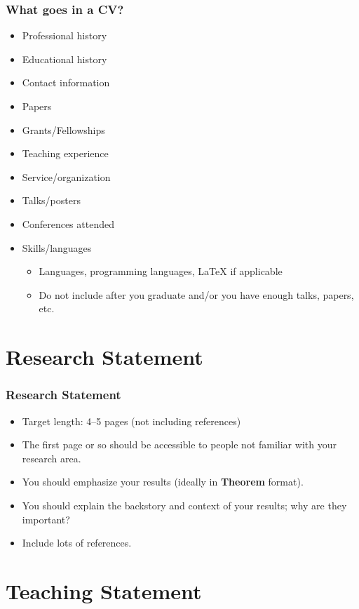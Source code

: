 \documentclass{beamer}
\begin{document}
\begin{frame}\frametitle{What goes in a CV?}

\begin{itemize}
	\item Professional history
	\item Educational history
	\item Contact information
	\item Papers
	\item Grants/Fellowships
	\item Teaching experience
	\item Service/organization
	\item Talks/posters
	\item Conferences attended
	\item Skills/languages
		\begin{itemize}
		\item Languages, programming languages, LaTeX if applicable
		\item Do not include after you graduate and/or you have enough talks, papers, etc.
	\end{itemize}
\end{itemize}

\end{frame}

\section{Research Statement}

\begin{frame}\frametitle{Research Statement}

\begin{itemize}
	\item Target length: 4--5 pages (not including references)
	\item The first page or so should be accessible to people not familiar with your research area.
	\item You should emphasize your results (ideally in \textbf{Theorem} format).
	\item You should explain the backstory and context of your results; why are they important?
	\item Include lots of references.
\end{itemize}

\end{frame}

\section{Teaching Statement}
\end{document}
